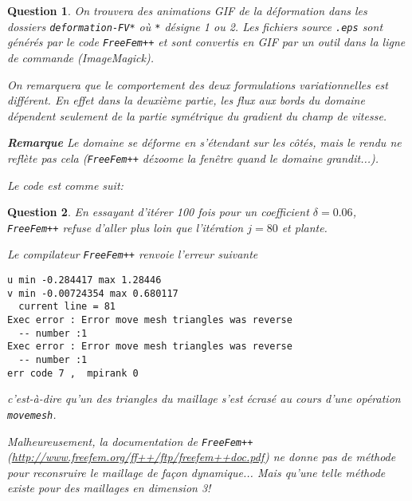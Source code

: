 \documentclass{article}
\theoremstyle{plain}
\newtheorem{ques}{Question}
\begin{document}
\begin{ques}
    On trouvera des animations GIF de la déformation dans les dossiers \verb|deformation-FV*| où \verb|*| désigne 1 ou 2. Les fichiers source \verb|.eps| sont générés par le code \verb|FreeFem++| et sont convertis en GIF par un outil dans la ligne de commande (ImageMagick).

    On remarquera que le comportement des deux formulations variationnelles est différent. En effet dans la deuxième partie, les flux aux bords du domaine dépendent seulement de la partie \textit{symétrique} du gradient du champ de vitesse.

    \textbf{Remarque} Le domaine se déforme en s'étendant sur les côtés, mais le rendu ne reflète pas cela (\verb|FreeFem++| dézoome la fenêtre quand le domaine grandit...).

    Le code est comme suit:
    
\end{ques}

\begin{ques}
    En essayant d'itérer 100 fois pour un coefficient $\delta = 0.06$, \verb|FreeFem++| refuse d'aller plus loin que l'itération $j=80$ et plante.

    Le compilateur \verb|FreeFem++| renvoie l'erreur suivante 
\begin{verbatim}
u min -0.284417 max 1.28446
v min -0.00724354 max 0.680117
  current line = 81
Exec error : Error move mesh triangles was reverse
  -- number :1
Exec error : Error move mesh triangles was reverse
  -- number :1
err code 7 ,  mpirank 0
    \end{verbatim}
    c'est-à-dire qu'un des triangles du maillage s'est écrasé au cours d'une opération \verb|movemesh|.

    Malheureusement, la documentation de \verb|FreeFem++| (\url{http://www.freefem.org/ff++/ftp/freefem++doc.pdf}) ne donne pas de méthode pour reconsruire le maillage de façon dynamique... Mais qu'une telle méthode existe pour des maillages en dimension 3!
\end{ques}
\end{document}
